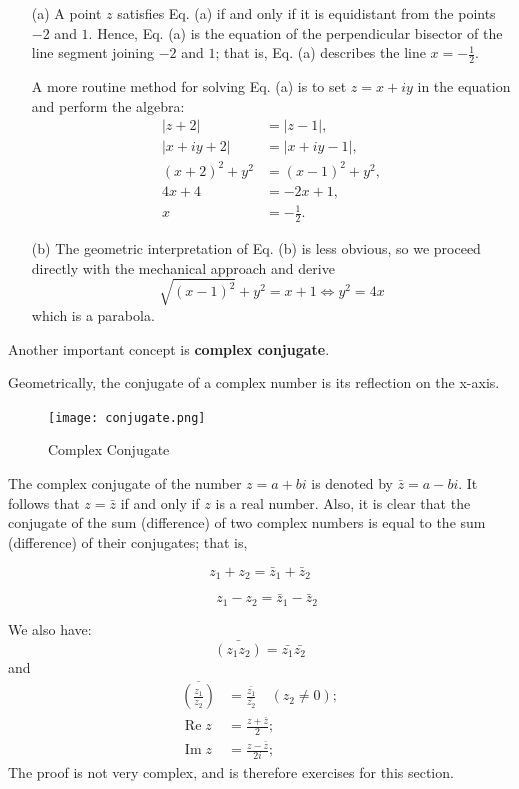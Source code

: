 \documentclass[
	12pt, %
	fleqn, %
	a4paper, %
]{LegrandOrangeBook}
\begin{document}
\begin{itemize}
    \item[(a)] A point \( z \) satisfies Eq. (a) if and only if it is equidistant from the points \( -2 \) and \( 1 \). Hence, Eq. (a) is the equation of the perpendicular bisector of the line segment joining \( -2 \) and \( 1 \); that is, Eq. (a) describes the line \( x = -\frac{1}{2} \).

    A more routine method for solving Eq. (a) is to set \( z = x + iy \) in the equation and perform the algebra:
    \begin{align*}
        |z + 2| &= |z - 1|, \\
        |x + iy + 2| &= |x + iy - 1|, \\
        (x + 2)^2 + y^2 &= (x - 1)^2 + y^2, \\
        4x + 4 &= -2x + 1, \\
        x &= -\frac{1}{2}.
    \end{align*}

    \item[(b)] The geometric interpretation of Eq. (b) is less obvious, so we proceed directly with the mechanical approach and derive
    $$\sqrt{(x-1)^2} + y^2 = x+1 \iff y^2 = 4x$$
    which is a parabola.
\end{itemize}
Another important concept is \textbf{complex conjugate}.

Geometrically, the conjugate of a complex number is its reflection on the x-axis.
\begin{figure}
    \centering
    \texttt{[image: conjugate.png]}
    \caption{Complex Conjugate}
  \end{figure}
  The complex conjugate of the number $z = a+bi$ is denoted by $\bar{z} = a-bi $.
  It follows that \( z = \bar{z} \) if and only if \( z \) is a real number. Also, it is clear that the conjugate of the sum (difference) of two complex numbers is equal to the sum (difference) of their conjugates; that is,

$$z_1 + z_2 = \bar{z}_1 + \bar{z}_2$$

$$\quad z_1 - z_2 = \bar{z}_1 - \bar{z}_2$$

We also have:
$$\bar{(z_1z_2)} = \bar{z_1} \bar{z_2}$$
and
$$\begin{aligned}\overline{\left(\frac{z_1}{z_2}\right)}&=\frac{\bar{z_1}}{\bar{z_2}}\quad(z_2\neq0);\\\operatorname{Re}z&=\frac{z+\bar{z}}2;\\\operatorname{Im}z&=\frac{z-\bar{z}}{2i};\end{aligned}$$
The proof is not very complex, and is therefore exercises for this section.
\\
\end{document}
